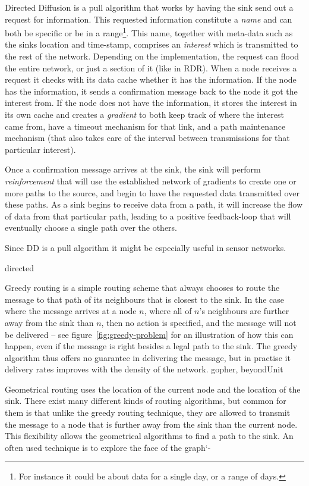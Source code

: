\begin{description}
{Directed Diffusion is a pull algorithm that works by having the sink send out a request for information. This requested information constitute a \emph{name} and can both be specific or be in a range\footnote{For instance it could be about data for a single day, or a range of days.}. This name, together with meta-data such as the sinks location and time-stamp, comprises an \emph{interest} which is transmitted to the rest of the network. Depending on the implementation, the request can flood the entire network, or just a section of it (like in RDR). When a node receives a request it checks with its data cache whether it has the information. If the node has the information, it sends a confirmation message back to the node it got the interest from. If the node does not have the information, it stores the interest in its own cache and creates a \emph{gradient} to both keep track of where the interest came from, have a timeout mechanism for that link, and a path maintenance mechanism (that also takes care of the interval between transmissions for that particular interest). 

Once a confirmation message arrives at the sink, the sink will perform \emph{reinforcement} that will use the established network of gradients to create one or more paths to the source, and begin to have the requested data transmitted over these paths. As a sink begins to receive data from a path, it will increase the flow of data from that particular path, leading to a positive feedback-loop that will eventually choose a single path over the others.

Since DD is a pull algorithm it might be especially useful in sensor networks.}
{directed}

{\label{section:greedy}Greedy routing is a simple routing scheme that always chooses to route the message to that path of its neighbours that is closest to the sink. In the case where the message arrives at a node $n$, where all of $n$'s neighbours are further away from the sink than $n$, then no action is specified, and the message will not be delivered -- see figure~\ref{fig:greedy-problem} for an illustration of how this can happen, even if the message is right besides a legal path to the sink. The greedy algorithm thus offers no guarantee in delivering the message, but in practise it delivery rates improves with the density of the network.}
{gopher, beyondUnit}
{Geometrical routing uses the location of the current node and the location of the sink. There exist many different kinds of routing algorithms, but common for them is that unlike the greedy routing technique, they are allowed to transmit the message to a node that is further away from the sink than the current node. This flexibility allows the geometrical algorithms to find a path to the sink. An often used technique is to explore the face of the graph`-

}
\end{description}
